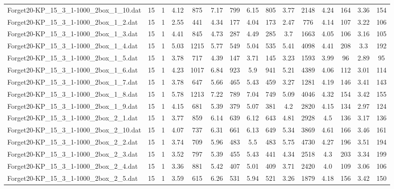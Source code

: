 \begin{table}[!ht]
{\begin{tabular}{lcccccccccccccc}
Forget20-KP\_15\_3\_1-1000\_2box\_1\_10.dat & 15 & 1 & 4.12 & 875 & 7.17 & 799 & 6.15 & 805 & 3.77 & 2148 & 4.24 & 164 & 3.36 & 154 \\
Forget20-KP\_15\_3\_1-1000\_2box\_1\_2.dat & 15 & 1 & 2.55 & 441 & 4.34 & 177 & 4.04 & 173 & 2.47 & 776 & 4.14 & 107 & 3.22 & 106 \\
Forget20-KP\_15\_3\_1-1000\_2box\_1\_3.dat & 15 & 1 & 4.41 & 845 & 4.73 & 287 & 4.49 & 285 & 3.7 & 1663 & 4.05 & 106 & 3.16 & 105 \\
Forget20-KP\_15\_3\_1-1000\_2box\_1\_4.dat & 15 & 1 & 5.03 & 1215 & 5.77 & 549 & 5.04 & 535 & 5.41 & 4098 & 4.41 & 208 & 3.3 & 192 \\
Forget20-KP\_15\_3\_1-1000\_2box\_1\_5.dat & 15 & 1 & 3.78 & 717 & 4.39 & 147 & 3.71 & 145 & 3.23 & 1593 & 3.99 & 96 & 2.89 & 95 \\
Forget20-KP\_15\_3\_1-1000\_2box\_1\_6.dat & 15 & 1 & 4.23 & 1017 & 6.84 & 923 & 5.9 & 941 & 5.21 & 4389 & 4.06 & 112 & 3.01 & 114 \\
Forget20-KP\_15\_3\_1-1000\_2box\_1\_7.dat & 15 & 1 & 3.78 & 647 & 5.66 & 465 & 5.43 & 459 & 3.27 & 1281 & 4.19 & 146 & 3.41 & 143 \\
Forget20-KP\_15\_3\_1-1000\_2box\_1\_8.dat & 15 & 1 & 5.78 & 1213 & 7.22 & 789 & 7.04 & 749 & 5.09 & 4046 & 4.32 & 154 & 3.42 & 155 \\
Forget20-KP\_15\_3\_1-1000\_2box\_1\_9.dat & 15 & 1 & 4.15 & 681 & 5.39 & 379 & 5.07 & 381 & 4.2 & 2820 & 4.15 & 134 & 2.97 & 124 \\
Forget20-KP\_15\_3\_1-1000\_2box\_2\_1.dat & 15 & 1 & 3.77 & 859 & 6.14 & 639 & 6.12 & 643 & 4.81 & 2928 & 4.5 & 136 & 3.17 & 136 \\
Forget20-KP\_15\_3\_1-1000\_2box\_2\_10.dat & 15 & 1 & 4.07 & 737 & 6.31 & 661 & 6.13 & 649 & 5.34 & 3869 & 4.61 & 166 & 3.46 & 161 \\
Forget20-KP\_15\_3\_1-1000\_2box\_2\_2.dat & 15 & 1 & 3.74 & 709 & 5.96 & 483 & 5.5 & 483 & 5.75 & 4730 & 4.27 & 196 & 3.51 & 194 \\
Forget20-KP\_15\_3\_1-1000\_2box\_2\_3.dat & 15 & 1 & 3.52 & 797 & 5.39 & 455 & 5.43 & 441 & 4.34 & 2518 & 4.3 & 203 & 3.34 & 199 \\
Forget20-KP\_15\_3\_1-1000\_2box\_2\_4.dat & 15 & 1 & 3.36 & 881 & 5.42 & 407 & 5.01 & 409 & 3.71 & 2420 & 4.0 & 109 & 3.06 & 106 \\
Forget20-KP\_15\_3\_1-1000\_2box\_2\_5.dat & 15 & 1 & 3.59 & 615 & 6.26 & 531 & 5.94 & 521 & 3.26 & 1879 & 4.18 & 156 & 3.42 & 150 \\

\end{tabular}}
\end{table}
